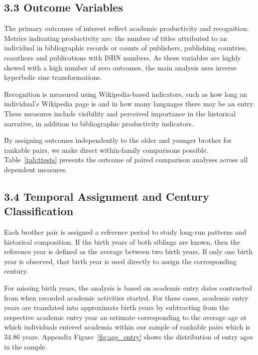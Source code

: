 \subsection*{3.3 Outcome Variables}
 
The primary outcomes of interest reflect academic productivity and recognition. Metrics indicating productivity are: the number of titles attributed to an individual in bibliographic records or counts of publishers, publishing countries, coauthors and publications with ISBN numbers. As these variables are highly skewed with a high number of zero outcomes, the main analysis uses inverse hyperbolic sine transformations.

Recognition is measured using Wikipedia-based indicators, such as how long an individual’s Wikipedia page is and in how many languages there may be an entry. These measures include visibility and perceived importance in the historical narrative, in addition to bibliographic productivity indicators.

By assigning outcomes independently to the older and younger brother for rankable pairs, we make direct within-family comparisons possible. Table~\ref{tab:ttests} presents the outcome of paired comparison analyses across all dependent measures.

\subsection*{3.4 Temporal Assignment and Century Classification}

Each brother pair is assigned a reference period to study long-run patterns and historical composition. If the birth years of both siblings are known, then the reference year is defined as the average between two birth years. If only one birth year is observed, that birth year is used directly to assign the corresponding century.

For missing birth years, the analysis is based on academic entry dates contructed from when recorded academic activities started. For these cases, academic entry years are translated into approximate birth years by subtracting from the respective academic entry year an estimate corresponding to the average age at which individuals entered academia within our sample of rankable pairs which is 34.86 years. Appendix Figure~\ref{fig:age_entry} shows the distribution of entry ages in the sample.

